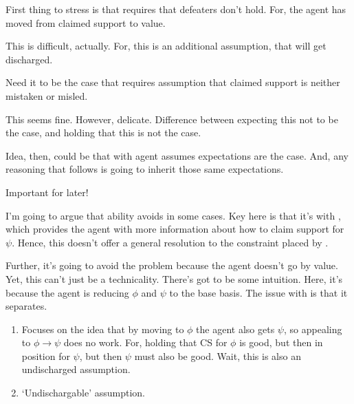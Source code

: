 \begin{note}[\RBV{}]
  First thing to stress is that \RBV{} requires that defeaters don't hold.
  For, the agent has moved from claimed support to value.

  This is difficult, actually.
  For, this is an additional assumption, that will get discharged.

  Need it to be the case that \RBV{} requires assumption that claimed support is neither mistaken or misled.

  This seems fine.
  However, delicate.
  Difference between expecting this not to be the case, and holding that this is not the case.

  Idea, then, could be that with \RBV{} agent assumes expectations are the case.
  And, any reasoning that follows is going to inherit those same expectations.
\end{note}

\begin{note}
  \color{red}
  Important for later!

  I'm going to argue that ability avoids \nI{} in some cases.
  Key here is that it's with \gsi{}, which provides the agent with more information about how to claim support for \(\psi\).
  Hence, this doesn't offer a general resolution to the constraint placed by \nI{}.

  Further, it's going to avoid the problem because the agent doesn't go by value.
  Yet, this can't just be a technicality.
  There's got to be some intuition.
  Here, it's because the agent is reducing \(\phi\) and \(\psi\) to the base basis.
  The issue with \RBV{} is that it separates.
\end{note}

\begin{note}
  \begin{enumerate}
  \item Focuses on the idea that by moving to \(\phi\) the agent also gets \(\psi\), so appealing to \(\phi \rightarrow \psi\) does no work.
    For, holding that CS for \(\phi\) is good, but then in position for \(\psi\), but then \(\psi\) must also be good.
    Wait, this is also an undischarged assumption.
  \item `Undischargable' assumption.
  \end{enumerate}
\end{note}

